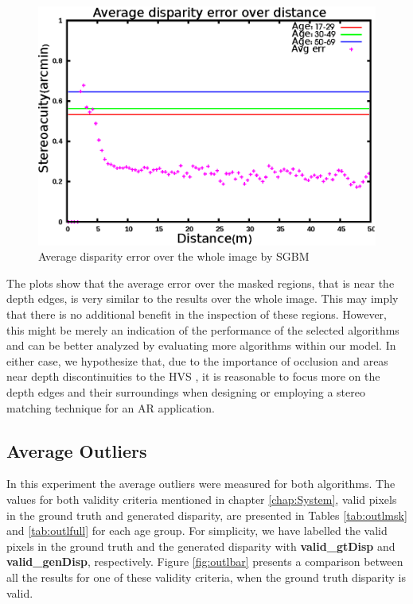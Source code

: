 \begin{figure}[H]
\centering
\includegraphics[scale=0.95]{sgbmfull3}
\caption{Average disparity error over the whole image by SGBM}
\label{fig:sgbmfull3}
\end{figure} 

The plots show that the average error over the masked regions, that is near the depth edges, is very similar to the results over the whole image. 
This may imply that there is no additional benefit in the inspection of these regions. 
However, this might be merely an indication of the performance of the selected algorithms and can be better analyzed by evaluating more algorithms 
within our model.
In either case, we hypothesize that, due to the importance of occlusion and areas near depth discontinuities to the HVS \cite{sze11},
it is reasonable to focus more on the depth edges and their surroundings when designing or employing a stereo matching technique for an AR application.

\subsection{Average Outliers}
In this experiment the average outliers were measured for both algorithms. 
The values for both validity criteria mentioned in chapter \ref{chap:System}, valid pixels in the ground truth and generated disparity, 
are presented in Tables \ref{tab:outlmsk} and \ref{tab:outlfull} for each age group. For simplicity, we have labelled the valid pixels
in the ground truth and the generated disparity with \textbf{valid\_gtDisp} and \textbf{valid\_genDisp}, respectively.
Figure \ref{fig:outlbar} presents a comparison between all the results for one of these validity criteria, when the ground truth disparity is valid. \newline

